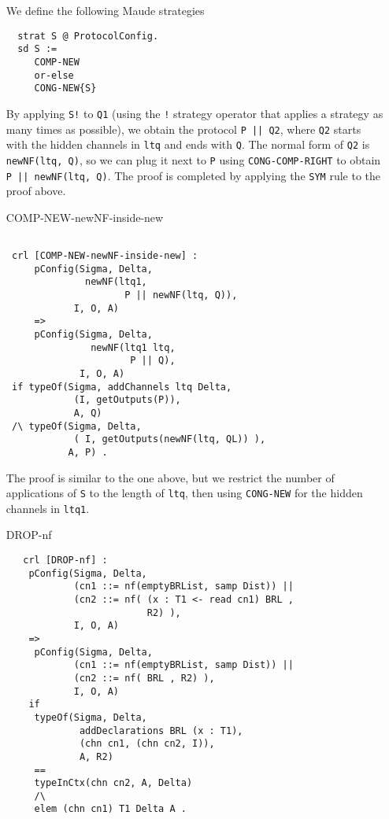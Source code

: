 \documentclass{article}
\begin{document}
\begin{itemize}
  We define the following Maude strategies
  \begin{lstlisting}
  strat S @ ProtocolConfig.
  sd S := 
     COMP-NEW
     or-else 
     CONG-NEW{S}
  \end{lstlisting}
  By applying \verb+S!+ to \verb+Q1+ (using the \verb+!+ strategy operator
   that applies a strategy as many times as possible), we obtain
   the protocol \verb+P || Q2+, where \verb+Q2+ starts with the hidden channels
   in \verb+ltq+ and ends with \verb+Q+. The normal form of \verb+Q2+ is
   \verb+newNF(ltq, Q)+, so we can plug it next to \verb+P+ using
   \verb+CONG-COMP-RIGHT+ to obtain \verb+P || newNF(ltq, Q)+.
   The proof is completed by applying the \verb+SYM+ rule to the proof above. 
    

\item[COMP-NEW-newNF-inside-new]
 \begin{lstlisting} 
 
 crl [COMP-NEW-newNF-inside-new] : 
     pConfig(Sigma, Delta, 
              newNF(ltq1, 
                     P || newNF(ltq, Q)), 
            I, O, A)
     =>   
     pConfig(Sigma, Delta, 
               newNF(ltq1 ltq, 
                      P || Q), 
             I, O, A)
 if typeOf(Sigma, addChannels ltq Delta, 
            (I, getOutputs(P)), 
            A, Q)
 /\ typeOf(Sigma, Delta, 
            ( I, getOutputs(newNF(ltq, QL)) ), 
           A, P) .
   \end{lstlisting}
   
   The proof is similar to the one above, but we restrict the number 
   of applications of \verb+S+ to the length of \verb+ltq+, then using
   \verb+CONG-NEW+ for the hidden channels in \verb+ltq1+.

\item[DROP-nf]
 \begin{lstlisting}
   crl [DROP-nf] :
    pConfig(Sigma, Delta,
            (cn1 ::= nf(emptyBRList, samp Dist)) || 
            (cn2 ::= nf( (x : T1 <- read cn1) BRL , 
                         R2) ),
            I, O, A) 
    =>           
     pConfig(Sigma, Delta,
            (cn1 ::= nf(emptyBRList, samp Dist)) || 
            (cn2 ::= nf( BRL , R2) ),
            I, O, A) 
    if 
     typeOf(Sigma, Delta, 
             addDeclarations BRL (x : T1), 
             (chn cn1, (chn cn2, I)), 
             A, R2) 
     == 
     typeInCtx(chn cn2, A, Delta)
     /\
     elem (chn cn1) T1 Delta A .  
       \end{lstlisting}


\end{itemize}
\end{document}
